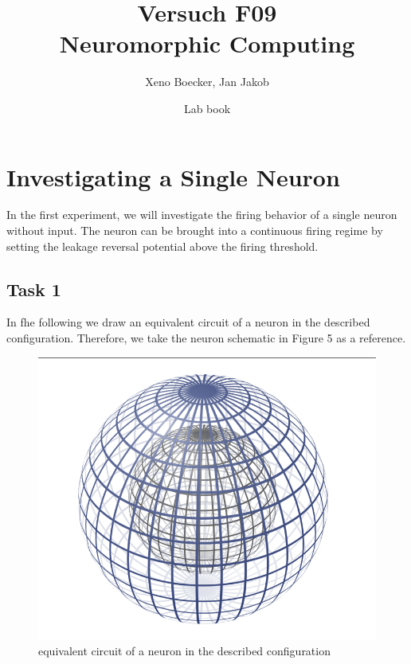 \documentclass[10pt,a4paper]{scrartcl}
\title{Versuch F09\\ Neuromorphic Computing}
\date{Lab book}
\author{Xeno Boecker, Jan Jakob}
\date{}
\begin{document}

\thispagestyle{empty}  %
 \maketitle

\newpage
\tableofcontents



\newpage



\section{Investigating a Single Neuron}

In the first experiment, we will investigate the firing behavior of a single neuron without input. The neuron can be brought into a continuous firing regime by setting the leakage reversal potential above
the firing threshold.

\subsection{Task 1}
In fhe following we draw an equivalent circuit of a neuron in the described configuration. Therefore, we take the neuron schematic in Figure 5 as a reference. 

\begin{figure} [ht]
\begin{center}
\includegraphics[scale=0.1]{pictures/example.png}
\caption{equivalent circuit of a neuron in the described configuration}
\label{fig:schaltung1}
\end{center}
\end{figure}
\end{document}
